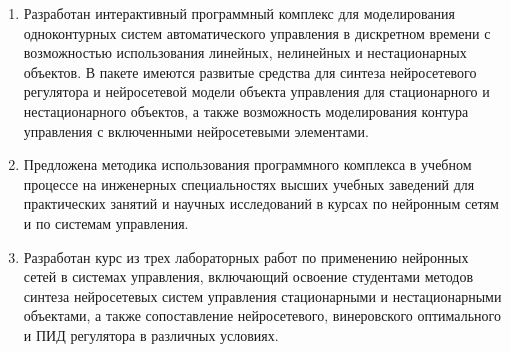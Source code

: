 
\begin{enumerate}
\item Разработан интерактивный программный комплекс для моделирования
  одноконтурных систем автоматического управления в дискретном времени
  с возможностью использования линейных, нелинейных и нестационарных
  объектов.  В пакете имеются развитые средства для синтеза
  нейросетевого регулятора и нейросетевой модели объекта управления
  для стационарного и нестационарного объектов, а также возможность
  моделирования контура управления с включенными нейросетевыми
  элементами.
\item Предложена методика использования программного комплекса в
  учебном процессе на инженерных специальностях высших учебных
  заведений для практических занятий и научных исследований в курсах
  по нейронным сетям и по системам управления.
\item Разработан курс из трех лабораторных работ по применению
  нейронных сетей в системах управления, включающий освоение
  студентами методов синтеза нейросетевых систем управления
  стационарными и нестационарными объектами, а также сопоставление
  нейросетевого, винеровского оптимального и ПИД регулятора в
  различных условиях.
\end{enumerate}

